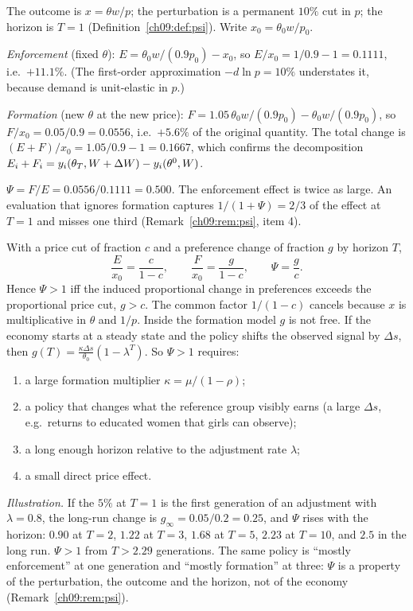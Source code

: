 \documentclass[../solutions_manual.tex]{subfiles}
\begin{document}

The outcome is $x = \theta w/p$; the perturbation is a permanent $10\%$ cut in $p$; the horizon is $T = 1$ (Definition~\ref{ch09:def:psi}). Write $x_0 = \theta_0w/p_0$.

 \emph{Enforcement} (fixed $\theta$): $E = \theta_0w/(0.9p_0) - x_0$, so $E/x_0 = 1/0.9 - 1 = 0.1111$, i.e.\ $+11.1\%$. (The first-order approximation $-d\ln p = 10\%$ understates it, because demand is unit-elastic in $p$.)

 \emph{Formation} (new $\theta$ at the new price): $F = 1.05\,\theta_0w/(0.9p_0) - \theta_0w/(0.9p_0)$, so $F/x_0 = 0.05/0.9 = 0.0556$, i.e.\ $+5.6\%$ of the original quantity. The total change is $(E + F)/x_0 = 1.05/0.9 - 1 = 0.1667$, which confirms the decomposition $E_i + F_i = y_i(\theta_T, W + \Delta W) - y_i(\theta^0, W)$.

 $\Psi = F/E = 0.0556/0.1111 = 0.500$. The enforcement effect is twice as large. An evaluation that ignores formation captures $1/(1+\Psi) = 2/3$ of the effect at $T = 1$ and misses one third (Remark~\ref{ch09:rem:psi}, item 4).

 With a price cut of fraction $c$ and a preference change of fraction $g$ by horizon $T$,
\[
\frac{E}{x_0} = \frac{c}{1-c}, \qquad \frac{F}{x_0} = \frac{g}{1-c}, \qquad \Psi = \frac{g}{c} .
\]
Hence $\Psi > 1$ iff the induced proportional change in preferences exceeds the proportional price cut, $g > c$. The common factor $1/(1-c)$ cancels because $x$ is multiplicative in $\theta$ and $1/p$. Inside the formation model $g$ is not free. If the economy starts at a steady state and the policy shifts the observed signal by $\Delta s$, then $g(T) = \frac{\kappa\Delta s}{\theta_0}(1 - \lambda^T)$. So $\Psi > 1$ requires:
\begin{enumerate}
\item a large formation multiplier $\kappa = \mu/(1-\rho)$;
\item a policy that changes what the reference group visibly earns (a large $\Delta s$, e.g.\ returns to educated women that girls can observe);
\item a long enough horizon relative to the adjustment rate $\lambda$;
\item a small direct price effect.
\end{enumerate}
\emph{Illustration.} If the $5\%$ at $T = 1$ is the first generation of an adjustment with $\lambda = 0.8$, the long-run change is $g_\infty = 0.05/0.2 = 0.25$, and $\Psi$ rises with the horizon: $0.90$ at $T = 2$, $1.22$ at $T = 3$, $1.68$ at $T = 5$, $2.23$ at $T = 10$, and $2.5$ in the long run. $\Psi > 1$ from $T > 2.29$ generations. The same policy is ``mostly enforcement'' at one generation and ``mostly formation'' at three: $\Psi$ is a property of the perturbation, the outcome and the horizon, not of the economy (Remark~\ref{ch09:rem:psi}).
\end{document}

